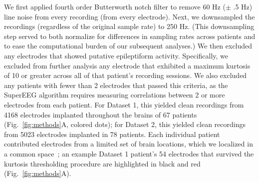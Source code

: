 \documentclass[11pt]{article}
\begin{document}
We first applied fourth order Butterworth notch filter to remove 60 Hz
($\pm$ .5 Hz) line noise from every recording (from every electrode).
Next, we downsampled the recordings (regardless of the original sample
rate) to 250 Hz.  (This downsampling step served to both normalize for
differences in sampling rates across patients and to ease the
computational burden of our subsequent analyses.)  We then excluded
any electrodes that showed putative epileptiform activity.
Specifically, we excluded from further analysis any electrode that
exhibited a maximum kurtosis of 10 or greater across all of that
patient's recording sessions.  We also excluded any patients with
fewer than 2 electrodes that passed this criteria, as the SuperEEG
algorithm requires measuring correlations between 2 or more electrodes
from each patient.  For Dataset 1, this yielded clean recordings from
4168 electrodes implanted throughout the brains of 67 patients
(Fig.~\ref{fig:methods}A, colored dots); for Dataset 2, this yielded
clean recordings from 5023 electrodes implanted in 78 patients.  Each
individual patient contributed electrodes from a limited set of brain
locations, which we localized in a common
space~\citep[MNI152;][]{GrabEtal06}; an example Dataset 1 patient's 54
electrodes that survived the kurtosis thresholding procedure are
highlighted in black and red (Fig.~\ref{fig:methods}A).
\end{document}
